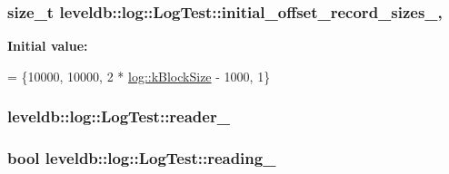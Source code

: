 \hypertarget{classleveldb_1_1log_1_1_log_test_a1c32fd131248b038f38d320558a6c211}{
\subsubsection[{initial\-\_\-offset\-\_\-record\-\_\-sizes\-\_\-}]{\setlength{\rightskip}{0pt plus 5cm}size\-\_\-t leveldb\-::log\-::\-Log\-Test\-::initial\-\_\-offset\-\_\-record\-\_\-sizes\-\_\-\hspace{0.3cm}{\ttfamily [static]}, {\ttfamily [private]}}}\label{classleveldb_1_1log_1_1_log_test_a1c32fd131248b038f38d320558a6c211}
{\bfseries Initial value\-:}
\begin{DoxyCode}
=
    \{10000,  
     10000,
     2 * \hyperlink{namespaceleveldb_1_1log_a2daa4274b5fc09292a7d856072f379b2}{log::kBlockSize} - 1000,  
     1\}
\end{DoxyCode}
\hypertarget{classleveldb_1_1log_1_1_log_test_a7011f0308081ffe914c3b131948f06f5}{
\subsubsection[{reader\-\_\-}]{ leveldb\-::log\-::\-Log\-Test\-::reader\-\_\-\hspace{0.3cm}{\ttfamily [private]}}}\label{classleveldb_1_1log_1_1_log_test_a7011f0308081ffe914c3b131948f06f5}
\hypertarget{classleveldb_1_1log_1_1_log_test_a9aa3611d063dee048f778dd10aab37ba}{
\subsubsection[{reading\-\_\-}]{\setlength{\rightskip}{0pt plus 5cm}bool leveldb\-::log\-::\-Log\-Test\-::reading\-\_\-\hspace{0.3cm}{\ttfamily [private]}}}\label{classleveldb_1_1log_1_1_log_test_a9aa3611d063dee048f778dd10aab37ba}
